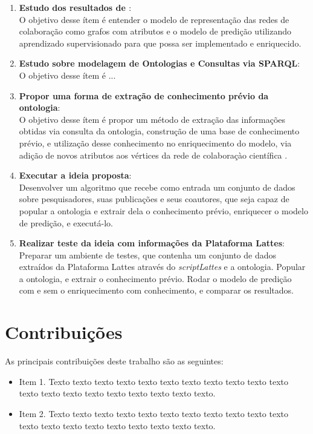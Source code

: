 \begin{enumerate}
    \item \textbf{Estudo dos resultados de \citet{Cervantes2014}}: \\
      O objetivo desse ítem é entender o modelo de representação das redes de colaboração como grafos com atributos e o modelo de predição utilizando aprendizado supervisionado para que possa ser implementado e enriquecido.
    \item \textbf{Estudo sobre modelagem de Ontologias e Consultas via SPARQL}: \\
      O objetivo desse ítem é  ...
    \item \textbf{Propor uma forma de extração de conhecimento prévio da ontologia}: \\
      O objetivo desse ítem é propor um método de extração das informações obtidas via consulta da ontologia, construção de uma base de conhecimento prévio, e utilização desse conhecimento no enriquecimento do modelo, via adição de novos atributos aos vértices da rede de colaboraçào científica .
    \item \textbf{Executar a ideia proposta}: \\
      Desenvolver um algoritmo que recebe como entrada um conjunto de dados sobre pesquisadores, suas publicações e seus coautores, que seja capaz de popular a ontologia e extrair dela o conhecimento prévio, enriquecer o modelo de predição, e executá-lo. %
    \item \textbf{Realizar teste da ideia com informações da Plataforma Lattes}: \\
      Preparar um ambiente de testes, que contenha um conjunto de dados extraídos da Plataforma Lattes através do \textit{scriptLattes} e a ontologia. Popular a ontologia, e extrair o conhecimento prévio. Rodar o modelo de predição com e sem o enriquecimento com conhecimento, e comparar os resultados. %
\end{enumerate}


\section{Contribuições}
\label{sec:contribucoes}

As principais contribuições deste trabalho são as seguintes:

\begin{itemize}
  \item Item 1. Texto texto texto texto texto texto texto texto texto texto
  texto texto texto texto texto texto texto texto texto texto.

  \item Item 2. Texto texto texto texto texto texto texto texto texto texto
  texto texto texto texto texto texto texto texto texto texto.

\end{itemize}

